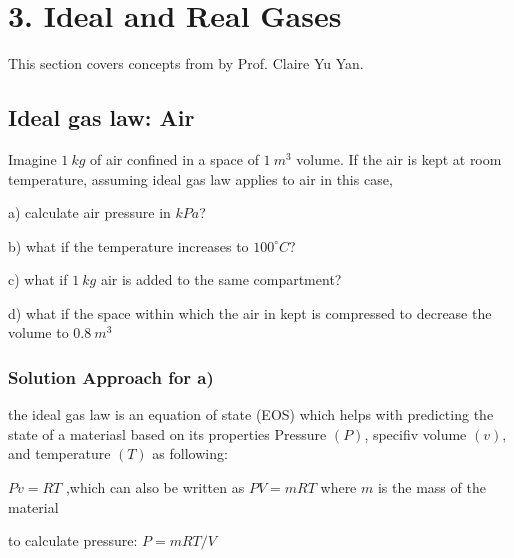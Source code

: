 \documentclass[letterpaper,10pt,english]{jupyterBook}
\begin{document}
\chapter{3. Ideal and Real Gases}
\label{\detokenize{notebooks/Chapter3/chapter3:ideal-and-real-gases}}\label{\detokenize{notebooks/Chapter3/chapter3::doc}}
\sphinxAtStartPar
This section covers concepts from  by Prof. Claire Yu Yan.

\sphinxstepscope


\section{Ideal gas law: Air}
\label{\detokenize{notebooks/Chapter3/CH3-Q1_v1:ideal-gas-law-air}}\label{\detokenize{notebooks/Chapter3/CH3-Q1_v1::doc}}
\sphinxAtStartPar
Imagine \(1\:kg\) of air confined in a space of \(1\:m^3\) volume. If the air is kept at room temperature, assuming ideal gas law applies to air in this case,

\sphinxAtStartPar
a) calculate air pressure in \(kPa\)?

\sphinxAtStartPar
b) what if the temperature increases to \(100 ^{\circ} C\)?

\sphinxAtStartPar
c) what if \(1\:kg\) air is added to the same compartment?

\sphinxAtStartPar
d) what if the space within which the air in kept is compressed to decrease the volume to \(0.8\:m^3\)


\subsection{Solution Approach for a)}
\label{\detokenize{notebooks/Chapter3/CH3-Q1_v1:solution-approach-for-a}}
\sphinxAtStartPar
the ideal gas law is an equation of state (EOS) which helps with predicting the state of a materiasl based on its properties Pressure \((P)\), specifiv volume \((v)\), and temperature \((T)\) as following:

\sphinxAtStartPar
\(Pv=RT\) ,which can also be written as 
\(PV=mRT\) where \(m\) is the mass of the material

\sphinxAtStartPar
to calculate pressure: 
\(P=mRT/V\)
\end{document}
